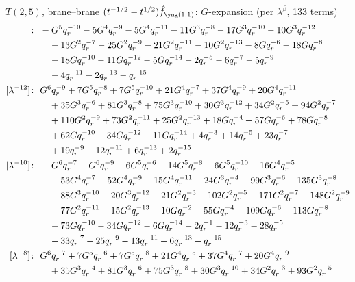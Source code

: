 $T(2,5)$, brane--brane $(t^{-1/2} - t^{1/2})\hat f_{\yoneone}$: $G$-expansion (per $\lambda^\beta$, 133 terms)
\begin{align*}
[\lambda^{-14}]\colon\ & -G^{5} \qr^{-10} -5 G^{4} \qr^{-9} -5 G^{4} \qr^{-11} -11 G^{3} \qr^{-8} -17 G^{3} \qr^{-10} -10 G^{3} \qr^{-12} \\
& \quad -13 G^{2} \qr^{-7} -25 G^{2} \qr^{-9} -21 G^{2} \qr^{-11} -10 G^{2} \qr^{-13} -8 G \qr^{-6} -18 G \qr^{-8} \\
& \quad -18 G \qr^{-10} -11 G \qr^{-12} -5 G \qr^{-14} -2 \qr^{-5} -6 \qr^{-7} -5 \qr^{-9} \\
& \quad -4 \qr^{-11} -2 \qr^{-13} -\qr^{-15} \\
[\lambda^{-12}]\colon\ & G^{6} \qr^{-9} +7 G^{5} \qr^{-8} +7 G^{5} \qr^{-10} +21 G^{4} \qr^{-7} +37 G^{4} \qr^{-9} +20 G^{4} \qr^{-11} \\
& \quad +35 G^{3} \qr^{-6} +81 G^{3} \qr^{-8} +75 G^{3} \qr^{-10} +30 G^{3} \qr^{-12} +34 G^{2} \qr^{-5} +94 G^{2} \qr^{-7} \\
& \quad +110 G^{2} \qr^{-9} +73 G^{2} \qr^{-11} +25 G^{2} \qr^{-13} +18 G \qr^{-4} +57 G \qr^{-6} +78 G \qr^{-8} \\
& \quad +62 G \qr^{-10} +34 G \qr^{-12} +11 G \qr^{-14} +4 \qr^{-3} +14 \qr^{-5} +23 \qr^{-7} \\
& \quad +19 \qr^{-9} +12 \qr^{-11} +6 \qr^{-13} +2 \qr^{-15} \\
[\lambda^{-10}]\colon\ & -G^{6} \qr^{-7} -G^{6} \qr^{-9} -6 G^{5} \qr^{-6} -14 G^{5} \qr^{-8} -6 G^{5} \qr^{-10} -16 G^{4} \qr^{-5} \\
& \quad -53 G^{4} \qr^{-7} -52 G^{4} \qr^{-9} -15 G^{4} \qr^{-11} -24 G^{3} \qr^{-4} -99 G^{3} \qr^{-6} -135 G^{3} \qr^{-8} \\
& \quad -88 G^{3} \qr^{-10} -20 G^{3} \qr^{-12} -21 G^{2} \qr^{-3} -102 G^{2} \qr^{-5} -171 G^{2} \qr^{-7} -148 G^{2} \qr^{-9} \\
& \quad -77 G^{2} \qr^{-11} -15 G^{2} \qr^{-13} -10 G \qr^{-2} -55 G \qr^{-4} -109 G \qr^{-6} -113 G \qr^{-8} \\
& \quad -73 G \qr^{-10} -34 G \qr^{-12} -6 G \qr^{-14} -2 \qr^{-1} -12 \qr^{-3} -28 \qr^{-5} \\
& \quad -33 \qr^{-7} -25 \qr^{-9} -13 \qr^{-11} -6 \qr^{-13} -\qr^{-15} \\
[\lambda^{-8}]\colon\ & G^{6} \qr^{-7} +7 G^{5} \qr^{-6} +7 G^{5} \qr^{-8} +21 G^{4} \qr^{-5} +37 G^{4} \qr^{-7} +20 G^{4} \qr^{-9} \\
& \quad +35 G^{3} \qr^{-4} +81 G^{3} \qr^{-6} +75 G^{3} \qr^{-8} +30 G^{3} \qr^{-10} +34 G^{2} \qr^{-3} +93 G^{2} \qr^{-5} \\

\end{align*}
